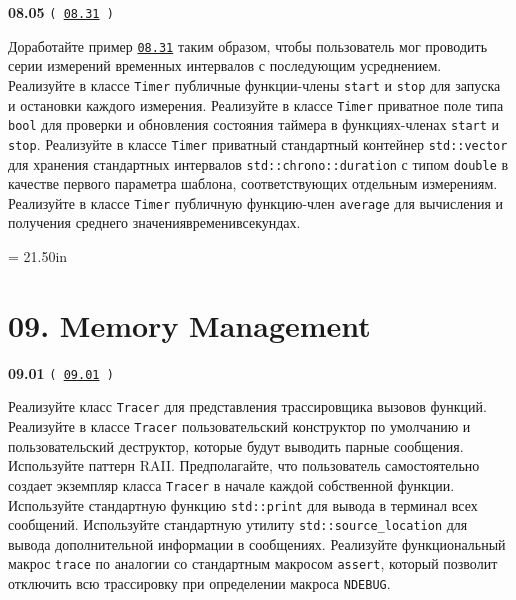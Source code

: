 \documentclass[a4paper,12pt]{article}
\begin{document}
\bigskip

{\large \textbf{08.05} \texttt{(\,\href{https://github.com/i-s-m-mipt/Education/blob/master/projects/examples/source/08.31.cpp}{08.31}\,)}}

\bigskip

Доработайте пример \href{https://github.com/i-s-m-mipt/Education/blob/master/projects/examples/source/08.31.cpp}{\texttt{08.31}} таким образом, чтобы пользователь мог проводить серии измерений временных интервалов с последующим усреднением. Реализуйте в классе \lstinline{Timer} публичные функции-члены \lstinline{start} и \lstinline{stop} для запуска и остановки каждого измерения. Реализуйте в классе \lstinline{Timer} приватное поле типа \lstinline{bool} для проверки и обновления состояния таймера в функциях-членах \lstinline{start} и \lstinline{stop}. Реализуйте в классе \lstinline{Timer} приватный стандартный контейнер \lstinline{std::vector} для хранения стандартных интервалов \lstinline{std::chrono::duration} с типом \lstinline{double} в качестве первого параметра шаблона, соответствующих отдельным измерениям. Реализуйте в классе \lstinline{Timer} публичную функцию-член \lstinline{average} для вычисления и получения среднего значения\:времени\:в\:секундах.



\newpage\thispagestyle{empty}\pdfpageheight = 21.50in\enlargethispage{100in}

\section{09. Memory Management}

{\large \textbf{09.01} \texttt{(\,\href{https://github.com/i-s-m-mipt/Education/blob/master/projects/examples/source/09.01.cpp}{09.01}\,)}}

\bigskip

Реализуйте класс \lstinline{Tracer} для представления трассировщика вызовов функций. Реализуйте в классе \lstinline{Tracer} пользовательский конструктор по умолчанию и пользовательский деструктор, которые будут выводить парные сообщения. Используйте паттерн RAII. Предполагайте, что пользователь самостоятельно создает экземпляр класса \lstinline{Tracer} в начале каждой собственной функции. Используйте стандартную функцию \lstinline{std::print} для вывода в терминал всех сообщений. Используйте стандартную утилиту \lstinline{std::source_location} для вывода дополнительной информации в сообщениях. Реализуйте функциональный макрос \lstinline{trace} по аналогии со стандартным макросом \lstinline{assert}, который позволит отключить всю трассировку при определении макроса \lstinline{NDEBUG}.
\end{document}
